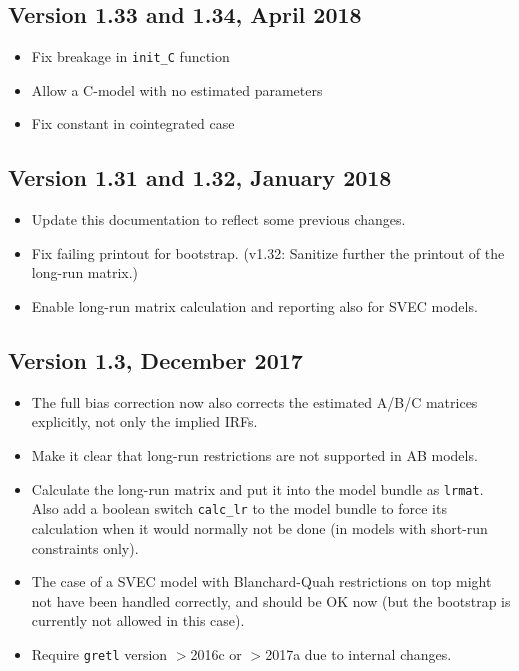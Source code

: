 \documentclass[a4paper,10pt]{article}
\begin{document}
\subsection*{Version 1.33 and 1.34, April 2018}
\begin{itemize}
\item Fix breakage in \verb|init_C| function
\item Allow a C-model with no estimated parameters
\item Fix constant in cointegrated case
\end{itemize}

\subsection*{Version 1.31 and 1.32, January 2018}
\begin{itemize}
\item Update this documentation to reflect some previous changes.

\item Fix failing printout for bootstrap. 
(v1.32: Sanitize further the printout of the long-run matrix.)

\item Enable long-run matrix calculation and reporting also for SVEC models.
\end{itemize}

\subsection*{Version 1.3, December 2017}

\begin{itemize}

\item The full bias correction now also corrects the estimated A/B/C matrices
explicitly, not only the implied IRFs.

\item Make it clear that long-run restrictions are not supported in AB models.

\item Calculate the long-run matrix and put it into the model bundle as \texttt{lrmat}.
Also add a boolean switch \texttt{calc\_lr} to the model bundle to force its 
calculation when it would normally not be done 
(in models with short-run constraints only).

\item The case of a SVEC model with Blanchard-Quah restrictions on top might 
not have been handled correctly, and should be OK now (but the bootstrap is 
currently not allowed in this case).

\item Require \texttt{gretl} version $>$2016c or $>$2017a due to internal changes.

\end{itemize}
\end{document}
